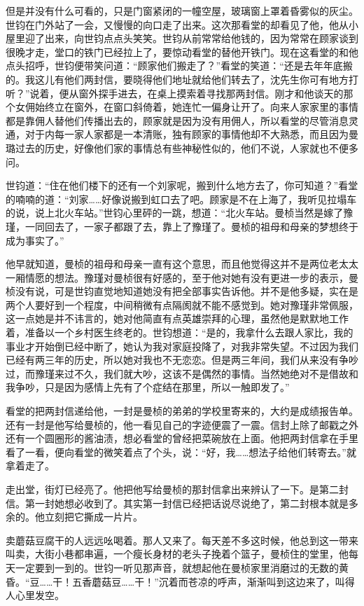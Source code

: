 \par 但是并没有什么可看的，只是门窗紧闭的一幢空屋，玻璃窗上罩着昏雾似的灰尘。世钧在门外站了一会，又慢慢的向口走了出来。这次那看堂的却看见了他，他从小屋里迎了出来，向世钧点点头笑笑。世钧从前常常给他钱的，因为常常在顾家谈到很晚才走，堂口的铁门已经拉上了，要惊动看堂的替他开铁门。现在这看堂的和他点头招呼，世钧便带笑问道：“顾家他们搬走了？”看堂的笑道：“还是去年年底搬的。我这儿有他们两封信，要晓得他们地址就给他们转去了，沈先生你可有地方打听？”说着，便从窗外探手进去，在桌上摸索着寻找那两封信。刚才和他谈天的那个女佣始终立在窗外，在窗口斜倚着，她连忙一偏身让开了。向来人家家里的事情都是靠佣人替他们传播出去的，顾家就是因为没有用佣人，所以看堂的尽管消息灵通，对于内每一家人家都是一本清账，独有顾家的事情他却不大熟悉，而且因为曼璐过去的历史，好像他们家的事情总有些神秘性似的，他们不说，人家就也不便多问。
\par 世钧道：“住在他们楼下的还有一个刘家呢，搬到什么地方去了，你可知道？”看堂的喃喃的道：“刘家……好像说搬到虹口去了吧。顾家是不在上海了，我听见拉塌车的说，说上北火车站。”世钧心里砰的一跳，想道：“北火车站。曼桢当然是嫁了豫瑾，一同回去了，一家子都跟了去，靠上了豫瑾了。曼桢的祖母和母亲的梦想终于成为事实了。”
\par 他早就知道，曼桢的祖母和母亲一直有这个意思，而且他觉得这并不是两位老太太一厢情愿的想法。豫瑾对曼桢很有好感的，至于他对她有没有更进一步的表示，曼桢没有说，可是世钧直觉地知道她没有把全部事实告诉他。并不是他多疑，实在是两个人要好到一个程度，中间稍微有点隔阂就不能不感觉到。她对豫瑾非常佩服，这一点她是并不讳言的，她对他简直有点英雄崇拜的心理，虽然他是默默地工作着，准备以一个乡村医生终老的。世钧想道：“是的，我拿什么去跟人家比，我的事业才开始倒已经中断了，她认为我对家庭投降了，对我非常失望。不过因为我们已经有两三年的历史，所以她对我也不无恋恋。但是两三年间，我们从来没有争吵过，而豫瑾来过不久，我们就大吵，这该不是偶然的事情。当然她绝对不是借故和我争吵，只是因为感情上先有了个症结在那里，所以一触即发了。”
\par 看堂的把两封信递给他，一封是曼桢的弟弟的学校里寄来的，大约是成绩报告单。还有一封是他写给曼桢的，他一看见自己的字迹便震了一震。信封上除了邮戳之外还有一个圆圈形的酱油渍，想必看堂的曾经把菜碗放在上面。他把两封信拿在手里看了一看，便向看堂的微笑着点了个头，说：“好，我……想法子给他们转寄去。”就拿着走了。
\par 走出堂，街灯已经亮了。他把他写给曼桢的那封信拿出来辨认了一下。是第二封信。第一封她想必收到了。其实第一封信已经把话说尽说绝了，第二封根本就是多余的。他立刻把它撕成一片片。
\par 卖蘑菇豆腐干的人远远吆喝着。那人又来了。每天差不多这时候，他总到这一带来叫卖，大街小巷都串遍，一个瘦长身材的老头子挽着个篮子，曼桢住的堂里，他每天一定要到一到的。世钧一听见那声音，就想起他在曼桢家里消磨过的无数的黄昏。“豆……干！五香蘑菇豆……干！”沉着而苍凉的呼声，渐渐叫到这边来了，叫得人心里发空。
